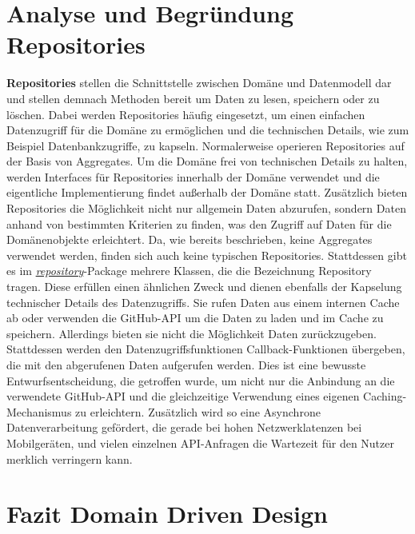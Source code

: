 \newpage

\section{Analyse und Begründung Repositories}
\textbf{Repositories} stellen die Schnittstelle zwischen Domäne und Datenmodell dar und stellen demnach Methoden bereit um Daten zu lesen, speichern oder zu löschen.
Dabei werden Repositories häufig eingesetzt, um einen einfachen Datenzugriff für die Domäne zu ermöglichen und die technischen Details, wie zum Beispiel Datenbankzugriffe, zu kapseln.
Normalerweise operieren Repositories auf der Basis von Aggregates.
Um die Domäne frei von technischen Details zu halten, werden Interfaces für Repositories innerhalb der Domäne verwendet und die eigentliche Implementierung findet außerhalb der Domäne statt.
Zusätzlich bieten Repositories die Möglichkeit nicht nur allgemein Daten abzurufen, sondern Daten anhand von bestimmten Kriterien zu finden, was den Zugriff auf Daten für die Domänenobjekte erleichtert.
\newline
Da, wie bereits beschrieben, keine Aggregates verwendet werden, finden sich auch keine typischen Repositories.
Stattdessen gibt es im \textit{\href{https://github.com/lukaspanni/OpenSourceStats/tree/main/app/src/main/java/de/lukaspanni/opensourcestats/repository/}{repository}}-Package mehrere Klassen, die die Bezeichnung Repository tragen.
Diese erfüllen einen ähnlichen Zweck und dienen ebenfalls der Kapselung technischer Details des Datenzugriffs.
Sie rufen Daten aus einem internen Cache ab oder verwenden die GitHub-API um die Daten zu laden und im Cache zu speichern.
Allerdings bieten sie nicht die Möglichkeit Daten zurückzugeben. 
Stattdessen werden den Datenzugriffsfunktionen Callback-Funktionen übergeben, die mit den abgerufenen Daten aufgerufen werden.
Dies ist eine bewusste Entwurfsentscheidung, die getroffen wurde, um nicht nur die Anbindung an die verwendete GitHub-API und die gleichzeitige Verwendung eines eigenen Caching-Mechanismus zu erleichtern.
Zusätzlich wird  so eine Asynchrone Datenverarbeitung gefördert, die gerade bei hohen Netzwerklatenzen bei Mobilgeräten, und vielen einzelnen API-Anfragen die Wartezeit für den Nutzer merklich verringern kann.

\section{Fazit Domain Driven Design}

